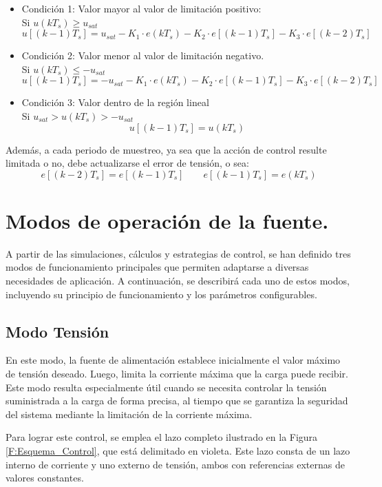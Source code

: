 \begin{itemize}
\item Condición 1: Valor mayor al valor de limitación positivo: \\
Si $u(kT_s)\geq u_{sat}$
\begin{equation}
	u[(k-1)T_s]=u_{sat}-K_{1}\cdot e(kT_s)-K_{2}\cdot e[(k-1)T_s]-K_{3}\cdot e[(k-2)T_s]
\end{equation}

\item Condición 2: Valor menor al valor de limitación negativo. \\
Si $u(kT_s)\leq -u_{sat}$
\begin{equation}
	u[(k-1)T_s]=-u_{sat}-K_{1}\cdot e(kT_s)-K_{2}\cdot e[(k-1)T_s]-K_{3}\cdot e[(k-2)T_s]
\end{equation}
\item Condición 3: Valor dentro de la región lineal \\
Si $u_{sat}>u(kT_s)>-u_{sat}$
\begin{equation}
	u[(k-1)T_s]=u(kT_s)
\end{equation}
\end{itemize} \par 

Además, a cada periodo de muestreo, ya sea que la acción de control resulte limitada o no, debe actualizarse el error de tensión, o sea:
\begin{equation}
	e[(k-2)T_s]=e[(k-1)T_s] \qquad	e[(k-1)T_s]=e(kT_s)
\end{equation}

\section{Modos de operación de la fuente.}
A partir de las simulaciones, cálculos y estrategias de control, se han definido tres modos de funcionamiento principales que permiten adaptarse a diversas necesidades de aplicación. A continuación, se describirá cada uno de estos modos, incluyendo su principio de funcionamiento y los parámetros configurables. \par 
\subsection{Modo Tensión}
En este modo, la fuente de alimentación establece inicialmente el valor máximo de tensión deseado. Luego, limita la corriente máxima que la carga puede recibir. Este modo resulta especialmente útil cuando se necesita controlar la tensión suministrada a la carga de forma precisa, al tiempo que se garantiza la seguridad del sistema mediante la limitación de la corriente máxima.\par
Para lograr este control, se emplea el lazo completo ilustrado en la Figura \ref{F:Esquema_Control}, que está delimitado en violeta. Este lazo consta de un lazo interno de corriente y uno externo de tensión, ambos con referencias externas de valores constantes.\par

